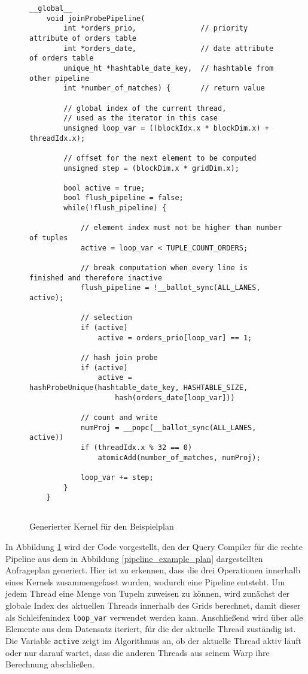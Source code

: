 \begin{figure}[h]
	\begin{lstlisting}[language=MyC++,
	linebackgroundcolor={%
	\ifnum\value{lstnumber}>24
		\ifnum\value{lstnumber}<28
			\color{design1!35}
		\fi
	\fi
	\ifnum\value{lstnumber}>28
		\ifnum\value{lstnumber}<33
			\color{design2!35}
		\fi
	\fi
	\ifnum\value{lstnumber}>33
		\ifnum\value{lstnumber}<38
			\color{design3!35}
		\fi
	\fi
	}]
	__global__
	void joinProbePipeline(
		int *orders_prio,              	// priority attribute of orders table
		int *orders_date,               // date attribute of orders table
		unique_ht *hashtable_date_key,  // hashtable from other pipeline
		int *number_of_matches) {       // return value
		
		// global index of the current thread,
		// used as the iterator in this case
		unsigned loop_var = ((blockIdx.x * blockDim.x) + threadIdx.x);
		
		// offset for the next element to be computed
		unsigned step = (blockDim.x * gridDim.x);
		
		bool active = true;
		bool flush_pipeline = false;
		while(!flush_pipeline) {
		
			// element index must not be higher than number of tuples
			active = loop_var < TUPLE_COUNT_ORDERS;
			
			// break computation when every line is finished and therefore inactive
			flush_pipeline = !__ballot_sync(ALL_LANES, active);
			
			// selection
			if (active)
				active = orders_prio[loop_var] == 1;
			
			// hash join probe
			if (active)
				active = hashProbeUnique(hashtable_date_key, HASHTABLE_SIZE, 
					hash(orders_date[loop_var]))
			
			// count and write
			numProj = __popc(__ballot_sync(ALL_LANES, active))
			if (threadIdx.x % 32 == 0)
				atomicAdd(number_of_matches, numProj);
			
			loop_var += step;
		}
	}
	
	\end{lstlisting}
	\caption{Generierter Kernel für den Beispielplan}
	\label{pipelining_example_code}
\end{figure}

In Abbildung \ref{pipelining_example_code} wird der Code vorgestellt, den der Query Compiler für die rechte Pipeline aus dem in Abbildung \ref{pipeline_example_plan} dargestellten Anfrageplan generiert.
Hier ist zu erkennen, dass die drei Operationen innerhalb eines Kernels zusammengefasst wurden, wodurch eine Pipeline entsteht.
Um jedem Thread eine Menge von Tupeln zuweisen zu können, wird zunächst der globale Index des aktuellen Threads innerhalb des Grids berechnet, damit dieser als Schleifenindex \texttt{loop\_var} verwendet werden kann.
Anschließend wird über alle Elemente aus dem Datensatz iteriert, für die der aktuelle Thread zuständig ist.
Die Variable \texttt{active} zeigt im Algorithmus an, ob der aktuelle Thread aktiv läuft oder nur darauf wartet, dass die anderen Threads aus seinem Warp ihre Berechnung abschließen.

